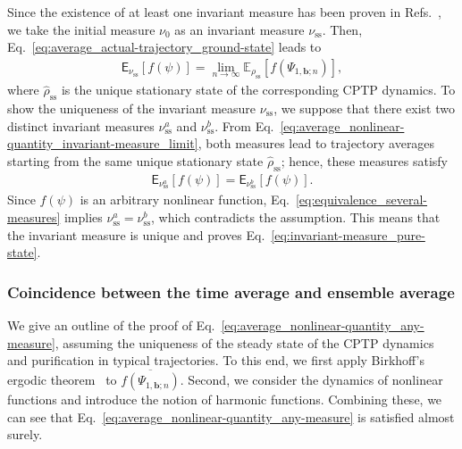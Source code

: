 \documentclass[preprint,pteplogo]{ptephy_v2}%
\numberwithin{equation}{section}
\theoremstyle{definition}
\begin{document}
Since the existence of at least one invariant measure has been proven in Refs.~\cite{benoist2019invariant, benoist2023limit}, we take the initial measure $\nu_0$ as an invariant measure $\nu_\mathrm{ss}$. 
Then, Eq.~\eqref{eq:average_actual-trajectory_ground-state} leads to
\begin{align}
    \mathsf{E}_{\nu_\mathrm{ss}}\left[f(\psi)\right]
    =\lim_{n\rightarrow\infty}
    \mathbb{E}_{\rho_\mathrm{ss}}\left[f(\Psi_{1,\bm{b};n})\right],
    \label{eq:average_nonlinear-quantity_invariant-measure_limit}
\end{align}
where $\hat{\rho}_\mathrm{ss}$ is the unique stationary state of the corresponding CPTP dynamics. 
To show the uniqueness of the invariant measure $\nu_\mathrm{ss}$, we suppose that there exist two distinct invariant measures $\nu_\mathrm{ss}^a$ and $\nu_\mathrm{ss}^b$.
From Eq.~\eqref{eq:average_nonlinear-quantity_invariant-measure_limit}, both measures lead to trajectory averages starting from the same unique stationary state $\hat{\rho}_\mathrm{ss}$; hence, these measures satisfy 
\begin{align}
    \mathsf{E}_{\nu_\mathrm{ss}^a}\left[f(\psi)\right]
    =\mathsf{E}_{\nu_\mathrm{ss}^b}\left[f(\psi)\right].
    \label{eq:equivalence_several-measures}
\end{align}
Since $f(\psi)$ is an arbitrary nonlinear function, Eq.~\eqref{eq:equivalence_several-measures} implies $\nu_\mathrm{ss}^a=\nu_\mathrm{ss}^b$, which contradicts the assumption. 
This means that the invariant measure is unique and proves Eq.~\eqref{eq:invariant-measure_pure-state}. 


\subsubsection{Coincidence between the time average and ensemble average}
\label{sec:time-average_ensemble-average}
We give an outline of the proof of Eq.~\eqref{eq:average_nonlinear-quantity_any-measure}, assuming the uniqueness of the steady state of the CPTP dynamics and purification in typical trajectories. 
To this end, we first apply Birkhoff's ergodic theorem~\cite{walters2000introduction} to $\overline{f(\Psi_{1,\bm{b};n})}$. 
Second, we consider the dynamics of nonlinear functions and introduce the notion of harmonic functions. 
Combining these, we can see that Eq.~\eqref{eq:average_nonlinear-quantity_any-measure} is satisfied almost surely.
\end{document}
